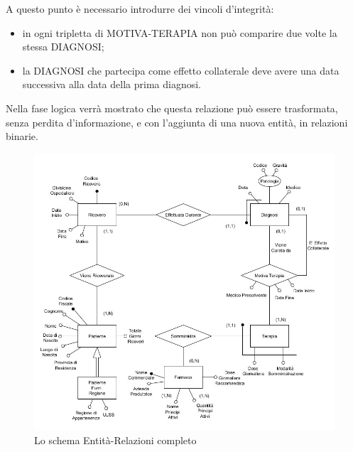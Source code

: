 \documentclass{article}
\begin{document}
A questo punto è necessario introdurre dei vincoli d'integrità:
\begin{itemize}
  \item in ogni tripletta di MOTIVA-TERAPIA non può comparire due volte la
    stessa DIAGNOSI;
  \item la DIAGNOSI che partecipa come effetto collaterale deve avere una data
    successiva alla data della prima diagnosi.
\end{itemize}
Nella fase logica verrà mostrato che questa relazione può essere trasformata,
senza perdita d'informazione, e con l'aggiunta di una nuova entità, in
relazioni binarie.


\begin{figure}[H] %
    \centering
    \includegraphics[width=\linewidth]{schema1}
    \caption{Lo schema Entità-Relazioni completo}
    \label{schema_ER_progettazione_modello}
\end{figure}
\end{document}
